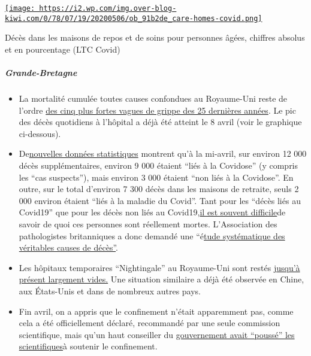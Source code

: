 \href{http://img.over-blog-kiwi.com/0/78/07/19/20200506/ob_91b2de_care-homes-covid.png\#width=600\&height=396}{\texttt{[image: https://i2.wp.com/img.over-blog-kiwi.com/0/78/07/19/20200506/ob\_91b2de\_care-homes-covid.png]}}

Décès dans les maisons de repos et de soins pour personnes âgées,
chiffres absolus et en pourcentage (LTC Covid)

\hypertarget{grande-bretagne-1}{%
\subparagraph{\texorpdfstring{\textbf{Grande-Bretagne}}{Grande-Bretagne}}\label{grande-bretagne-1}}

\begin{itemize}
\tightlist
\item
  La mortalité cumulée toutes causes confondues au Royaume-Uni reste de
  l'ordre \href{http://inproportion2.talkigy.com/}{des cinq plus fortes
  vagues de grippe des 25 dernières années}. Le pic des décès quotidiens
  à l'hôpital a déjà été atteint le 8 avril (voir le graphique
  ci-dessous).
\item
  De\href{https://www.telegraph.co.uk/politics/2020/05/01/evidence-rising-britains-lockdown-could-deadly-mistake/}{nouvelles
  données statistiques} montrent qu'à la mi-avril, sur environ 12 000
  décès supplémentaires, environ 9 000 étaient ``liés à la Covidose'' (y
  compris les ``cas suspects''), mais environ 3 000 étaient ``non liés à
  la Covidose''. En outre, sur le total d'environ 7 300 décès dans les
  maisons de retraite, seuls 2 000 environ étaient ``liés à la maladie
  du Covid''. Tant pour les ``décès liés au Covid19'' que pour les décès
  non liés au
  Covid19,\href{https://www.hsj.co.uk/commissioning/thousands-of-extra-deaths-outside-hospital-not-attributed-to-covid-19/7027459.article}{il
  est souvent difficile}de savoir de quoi ces personnes sont réellement
  mortes. L'Association des pathologistes britanniques a donc demandé
  une
  ``é\href{https://www.hsj.co.uk/coronavirus/systematic-reviews-to-discover-true-cause-of-outbreak-deaths/7027491.article}{tude
  systématique des véritables causes de décès''}.
\item
  Les hôpitaux temporaires ``Nightingale'' au Royaume-Uni sont restés
  \href{https://www.telegraph.co.uk/news/0/do-many-nhs-nightingale-hospitals-remain-empty/}{jusqu'à
  présent largement vides.} Une situation similaire a déjà été observée
  en Chine, aux États-Unis et dans de nombreux autres pays.
\item
  Fin avril, on a appris que le confinement n'était apparemment pas,
  comme cela a été officiellement déclaré, recommandé par une seule
  commission scientifique, mais qu'un haut conseiller du
  \href{https://www.bloomberg.com/news/articles/2020-04-28/top-aide-to-u-k-s-johnson-pushed-scientists-to-back-lockdown}{gouvernement
  avait ``poussé'' les scientifiques}à soutenir le confinement.
\end{itemize}


